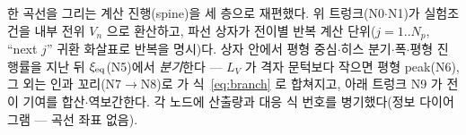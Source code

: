 \caption{한 곡선을 그리는 계산 진행(spine)을 세 층으로 재편했다. 위 트렁크(N0$\cdot$N1)가 실험조건을 내부
전위 $V_n$ 으로 환산하고, 파선 상자가 전이별 반복 계산 단위($j{=}1..N_p$, ``next $j$'' 귀환 화살표로 반복을
명시)다. 상자 안에서 평형 중심$\cdot$히스 분기$\cdot$폭$\cdot$평형 진행률을 지난 뒤 $\xi_\eq$(N5)에서
\emph{분기}한다 --- $L_V$ 가 격자 문턱보다 작으면 평형 peak(N6), 그 외는 인과 꼬리(N7$\to$N8)로 가
식~\eqref{eq:branch} 로 합쳐지고, 아래 트렁크 N9 가 전이 기여를 합산$\cdot$역보간한다. 각 노드에 산출량과
대응 식 번호를 병기했다(정보 다이어그램 --- 곡선 좌표 없음).}
\label{fig:spine}
